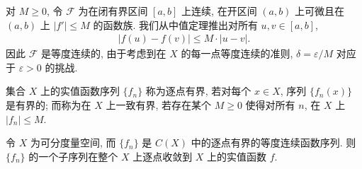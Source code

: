 \documentclass[../../main.tex]{subfiles}
\begin{document}
\begin{example}\label{example:ch10-等度连续例}
对 $M\geqslant 0$, 令 $\mathcal{F}$ 为在闭有界区间 $[a,b]$ 上连续, 在开区间 $(a,b)$ 上可微且在 $(a,b)$ 上 $|f'|\leqslant M$ 的函数族. 我们从中值定理推出对所有 $u,v\in[a,b]$,
\begin{align*}
|f(u)-f(v)|\leqslant M\cdot|u-v|.
\end{align*}
因此 $\mathcal{F}$ 是等度连续的, 由于考虑到在 $X$ 的每一点等度连续的准则, $\delta=\varepsilon/M$ 对应于 $\varepsilon>0$ 的挑战.
\end{example}

集合 $X$ 上的实值函数序列 $\{f_{n}\}$ 称为逐点有界, 若对每个 $x\in X$, 序列 $\{f_{n}(x)\}$ 是有界的; 而称为在 $X$ 上一致有界, 若存在某个 $M\geqslant 0$ 使得对所有 $n$, 在 $X$ 上 $|f_{n}|\leqslant M$.

\begin{lemma}\label{lemma:ch10-arzela-ascoli引理}
令 $X$ 为可分度量空间, 而 $\{f_{n}\}$ 是 $C(X)$ 中的逐点有界的等度连续函数序列. 则 $\{f_{n}\}$ 的一个子序列在整个 $X$ 上逐点收敛到 $X$ 上的实值函数 $f$.
\end{lemma}
\end{document}
